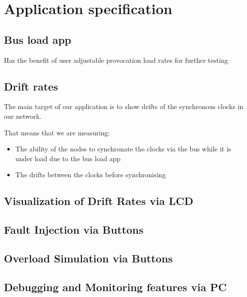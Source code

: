 \section{Application specification}

\subsection{Bus load app}
Has the benefit of user adjustable provocation load rates for 
further testing

\subsection{Drift rates}
The main target of our application is to show drifts of the synchronous 
clocks in our network. 

That means that we are measuring:
\begin{itemize}
 \item The ability of the nodes to synchronate the clocks via the bus 
while it is under load due to the bus load app
 \item The drifts between the clocks before synchronising
\end{itemize}

\subsection{Visualization of Drift Rates via LCD}

\subsection{Fault Injection via Buttons}

\subsection{Overload Simulation via Buttons}

\subsection{Debugging and Monitoring features via PC}